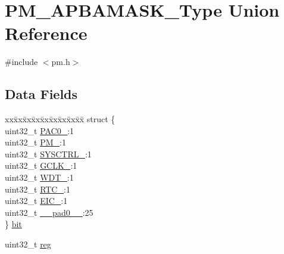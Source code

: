 \hypertarget{union_p_m___a_p_b_a_m_a_s_k___type}{}\section{P\+M\+\_\+\+A\+P\+B\+A\+M\+A\+S\+K\+\_\+\+Type Union Reference}
\label{union_p_m___a_p_b_a_m_a_s_k___type}


{\ttfamily \#include $<$pm.\+h$>$}

\subsection*{Data Fields}
\begin{DoxyCompactItemize}
\item 
\begin{tabbing}
xx\=xx\=xx\=xx\=xx\=xx\=xx\=xx\=xx\=\kill
struct \{\\
\>uint32\_t \mbox{\hyperlink{union_p_m___a_p_b_a_m_a_s_k___type_a0198f3fd49dfd28e29fef29a9369cbc6}{PAC0\_}}:1\\
\>uint32\_t \mbox{\hyperlink{union_p_m___a_p_b_a_m_a_s_k___type_a5fa77c1db97fe0df27405877ad32cbe0}{PM\_}}:1\\
\>uint32\_t \mbox{\hyperlink{union_p_m___a_p_b_a_m_a_s_k___type_a76c90ec0307eb06a4d7a1bffbbaaa539}{SYSCTRL\_}}:1\\
\>uint32\_t \mbox{\hyperlink{union_p_m___a_p_b_a_m_a_s_k___type_a11e26091ee645673dbb659d81cf3b0ad}{GCLK\_}}:1\\
\>uint32\_t \mbox{\hyperlink{union_p_m___a_p_b_a_m_a_s_k___type_a840c4ea01d6cdd40e18fc857d82b8db1}{WDT\_}}:1\\
\>uint32\_t \mbox{\hyperlink{union_p_m___a_p_b_a_m_a_s_k___type_a8ade88d2d592f4d181ed0639b82b8199}{RTC\_}}:1\\
\>uint32\_t \mbox{\hyperlink{union_p_m___a_p_b_a_m_a_s_k___type_a1018e7269a2e0ff9da32670da3f8d21a}{EIC\_}}:1\\
\>uint32\_t \mbox{\hyperlink{union_p_m___a_p_b_a_m_a_s_k___type_a3e57c2ef1c3ffb36722f000cc1156824}{\_\_pad0\_\_}}:25\\
\} \mbox{\hyperlink{union_p_m___a_p_b_a_m_a_s_k___type_a3027f514ff606b077ee3028b4aa3d5fa}{bit}}\\

\end{tabbing}\item 
uint32\+\_\+t \mbox{\hyperlink{union_p_m___a_p_b_a_m_a_s_k___type_a6b91636401516a477989a336376d7b40}{reg}}
\end{DoxyCompactItemize}


